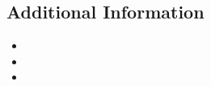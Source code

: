 \documentclass[11pt,a4paper]{article}
\begin{document}
\begin{itemize}[leftmargin=0pt,label={},itemsep=2em,topsep=0pt]
\section{Additional Information}
\begin{itemize}[leftmargin=*]
\item \OtherAvailability
\item \OtherDrivingLicense
\item \OtherRelocation
\end{itemize}

\end{itemize}
\end{document}
